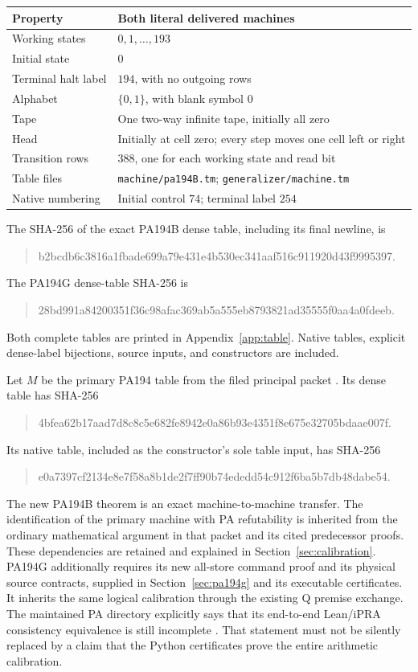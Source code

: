 \documentclass[11pt]{article}
\newcommand{\file}[1]{\nolinkurl{#1}}
\begin{document}
\begin{center}
\begin{tabular}{@{}ll@{}}
\toprule
Property & Both literal delivered machines\\
\midrule
Working states & \(0,1,\ldots,193\)\\
Initial state & \(0\)\\
Terminal halt label & \(194\), with no outgoing rows\\
Alphabet & \(\{0,1\}\), with blank symbol \(0\)\\
Tape & One two-way infinite tape, initially all zero\\
Head & Initially at cell zero; every step moves one cell left or right\\
Transition rows & \(388\), one for each working state and read bit\\
Table files & \file{machine/pa194B.tm}; \file{generalizer/machine.tm}\\
Native numbering & Initial control \(74\); terminal label \(254\)\\
\bottomrule
\end{tabular}
\end{center}
The SHA-256 of the exact PA194B dense table, including its final newline, is
\begin{quote}\small\ttfamily
b2bcdb6c3816a1fbade699a79e431e4b530ec341aaf516c911920d43f9995397.
\end{quote}
The PA194G dense-table SHA-256 is
\begin{quote}\small\ttfamily
28bd991a84200351f36c98afac369ab5a555eb8793821ad35555f0aa4a0fdeeb.
\end{quote}
Both complete tables are printed in Appendix~\ref{app:table}. Native tables,
explicit dense-label bijections, source inputs, and constructors are included.

Let \(M\) be the primary PA194 table from the filed principal packet
\cite{primary}. Its dense table has SHA-256
\begin{quote}\small\ttfamily
4bfea62b17aad7d8c8c5e682fe8942e0a86b93e4351f8e675e32705bdaae007f.
\end{quote}
Its native table, included as the constructor's sole table input, has SHA-256
\begin{quote}\small\ttfamily
e0a7397cf2134e8e7f58a8b1de2f7ff90b74ededd54c912f6ba5b7db48dabe54.
\end{quote}

The new PA194B theorem is an exact machine-to-machine transfer. The identification
of the primary machine with PA refutability is inherited from the ordinary
mathematical argument in that packet and its cited predecessor proofs.
These dependencies are retained and explained in Section~\ref{sec:calibration}.
PA194G additionally requires its new all-store command proof and its physical
source contracts, supplied in Section~\ref{sec:pa194g} and its executable
certificates. It inherits the same logical calibration through the existing
Q premise exchange.
The maintained PA directory explicitly says that its end-to-end Lean/iPRA
consistency equivalence is still incomplete \cite{status}. That statement
must not be silently replaced by a claim that the Python certificates prove
the entire arithmetic calibration.
\end{document}

